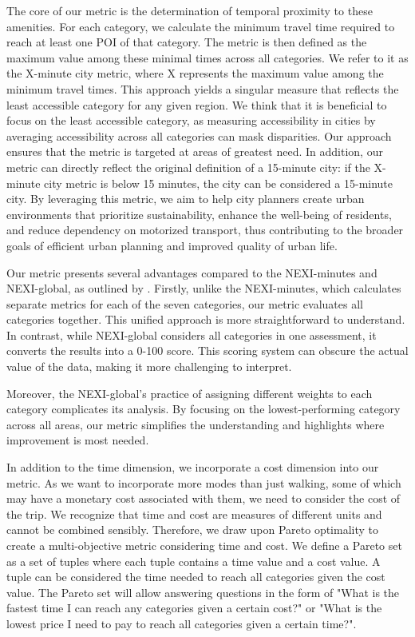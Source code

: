The core of our metric is the determination of temporal proximity to these amenities. 
For each category, we calculate the minimum travel time required to reach at least one POI of that category. 
The metric is then defined as the maximum value among these minimal times across all categories.
We refer to it as the X-minute city metric, where X represents the maximum value among the minimum travel times.
This approach yields a singular measure that reflects the least accessible category for any given region.
We think that it is beneficial to focus on the least accessible category, as measuring accessibility in cities by averaging accessibility across all categories can mask disparities. 
Our approach ensures that the metric is targeted at areas of greatest need. 
In addition, our metric can directly reflect the original definition of a 15-minute city: if the X-minute city metric is below 15 minutes, the city can be considered a 15-minute city.
By leveraging this metric, we aim to help city planners create urban environments that prioritize sustainability, enhance the well-being of residents, and reduce dependency on motorized transport, thus contributing to the broader goals of efficient urban planning and improved quality of urban life.

Our metric presents several advantages compared to the NEXI-minutes and NEXI-global, as outlined by .
Firstly, unlike the NEXI-minutes, which calculates separate metrics for each of the seven categories, our metric evaluates all categories together. 
This unified approach is more straightforward to understand. 
In contrast, while NEXI-global considers all categories in one assessment, it converts the results into a 0-100 score. 
This scoring system can obscure the actual value of the data, making it more challenging to interpret.

Moreover, the NEXI-global's practice of assigning different weights to each category complicates its analysis. 
By focusing on the lowest-performing category across all areas, our metric simplifies the understanding and highlights where improvement is most needed. 

In addition to the time dimension, we incorporate a cost dimension into our metric.
As we want to incorporate more modes than just walking, some of which may have a monetary cost associated with them, we need to consider the cost of the trip.
We recognize that time and cost are measures of different units and cannot be combined sensibly.
Therefore, we draw upon Pareto optimality to create a multi-objective metric considering time and cost.
We define a Pareto set as a set of tuples where each tuple contains a time value and a cost value.
A tuple can be considered the time needed to reach all categories given the cost value.
The Pareto set will allow answering questions in the form of "What is the fastest time I can reach any categories given a certain cost?" or "What is the lowest price I need to pay to reach all categories given a certain time?".


